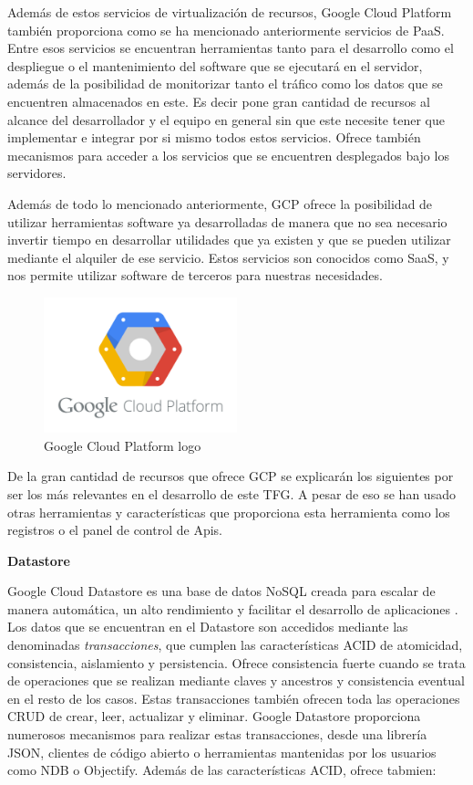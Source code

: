 Además de estos servicios de virtualización de recursos, Google Cloud Platform también proporciona como se ha mencionado anteriormente servicios de \acs{PaaS}. Entre esos servicios se encuentran herramientas tanto para el desarrollo como el despliegue o el mantenimiento del software que se ejecutará en el servidor, además de la posibilidad de monitorizar tanto el tráfico como los datos que se encuentren almacenados en este. Es decir pone gran cantidad de recursos al alcance del desarrollador y el equipo en general sin que este necesite tener que implementar e integrar por si mismo todos estos servicios. Ofrece también mecanismos para acceder a los servicios que se encuentren desplegados bajo los servidores.

Además de todo lo mencionado anteriormente, \acs{GCP} ofrece la posibilidad de utilizar herramientas software ya desarrolladas de manera que no sea necesario invertir tiempo en desarrollar utilidades que ya existen y que se pueden utilizar mediante el alquiler de ese servicio. Estos servicios son conocidos como \acs{SaaS}, y nos permite utilizar software de terceros para nuestras necesidades.


\begin{figure}[!h]
\begin{center}
\includegraphics[width=0.5\textwidth]{./figures/GCP.png}
\caption{Google Cloud Platform logo}
\label{fig:android-studio}
\end{center}
\end{figure}

De la gran cantidad de recursos que ofrece \acs{GCP} se explicarán los siguientes por ser los más relevantes en el desarrollo de este \acs{TFG}. A pesar de eso se han usado otras herramientas y características que proporciona esta herramienta como los registros o el panel de control de Apis.

\textbf{Datastore}

Google Cloud Datastore es una base de datos NoSQL creada para escalar de manera automática, un alto rendimiento y facilitar el desarrollo de aplicaciones \cite{Datastore}. Los datos que se encuentran en el Datastore son accedidos mediante las denominadas \textit{transacciones}, que cumplen las características \acs{ACID} de atomicidad, consistencia, aislamiento y persistencia. Ofrece consistencia fuerte cuando se trata de operaciones que se realizan mediante claves y ancestros y consistencia eventual en el resto de los casos. Estas transacciones también ofrecen toda las operaciones \acs{CRUD} de crear, leer, actualizar y eliminar. Google Datastore proporciona numerosos mecanismos para realizar estas transacciones, desde una librería JSON, clientes de código abierto o herramientas mantenidas por los usuarios como NDB o Objectify. Además de las características \acs{ACID}, ofrece tabmien:

